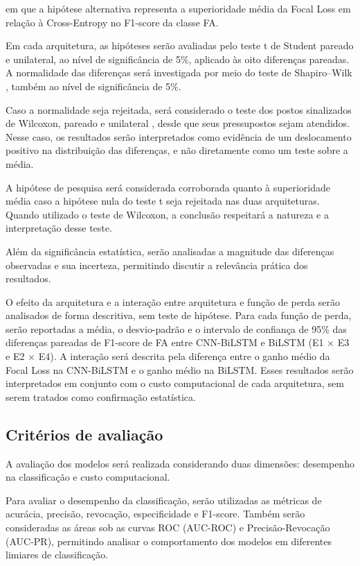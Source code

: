 \documentclass[
    12pt,                %
    openright,           %
    oneside,             %
    a4paper,             %
    english,             %
    brazil               %
]{abntex2}
\begin{document}
em que a hipótese alternativa representa a
superioridade média da Focal Loss em relação à
Cross-Entropy no F1-score da classe FA.

Em cada arquitetura, as hipóteses serão avaliadas
pelo teste t de Student pareado e unilateral, ao
nível de significância de 5\%, aplicado às oito
diferenças pareadas. A normalidade das diferenças
será investigada por meio do teste de Shapiro--Wilk
\cite{Shapiro1965}, também ao nível de
significância de 5\%.

Caso a normalidade seja rejeitada, será considerado
o teste dos postos sinalizados de Wilcoxon, pareado
e unilateral \cite{Wilcoxon1945}, desde que seus
pressupostos sejam atendidos. Nesse caso, os
resultados serão interpretados como evidência de
um deslocamento positivo na distribuição das
diferenças, e não diretamente como um teste
sobre a média.

A hipótese de pesquisa será considerada corroborada
quanto à superioridade média caso a hipótese nula
do teste t seja rejeitada nas duas arquiteturas.
Quando utilizado o teste de Wilcoxon, a conclusão
respeitará a natureza e a interpretação desse teste.

Além da significância estatística, serão analisadas
a magnitude das diferenças observadas e sua
incerteza, permitindo discutir a relevância prática
dos resultados.

O efeito da arquitetura e a interação entre
arquitetura e função de perda serão analisados de
forma descritiva, sem teste de hipótese. Para cada
função de perda, serão reportadas a média, o
desvio-padrão e o intervalo de confiança de 95\% das
diferenças pareadas de F1-score de FA entre
CNN-BiLSTM e BiLSTM (E1 $\times$ E3 e E2 $\times$ E4).
A interação será descrita pela diferença entre o ganho
médio da Focal Loss na CNN-BiLSTM e o ganho médio na
BiLSTM. Esses resultados serão interpretados em
conjunto com o custo computacional de cada
arquitetura, sem serem tratados como confirmação
estatística.


\subsection{Critérios de avaliação}
A avaliação dos modelos será realizada considerando duas dimensões: desempenho na classificação e custo computacional.

Para avaliar o desempenho da classificação, serão utilizadas as
métricas de acurácia, precisão, revocação, especificidade e
F1-score. Também serão consideradas as áreas sob as curvas ROC
(AUC-ROC) e Precisão-Revocação (AUC-PR), permitindo analisar
o comportamento dos modelos em diferentes limiares de classificação.
\end{document}
